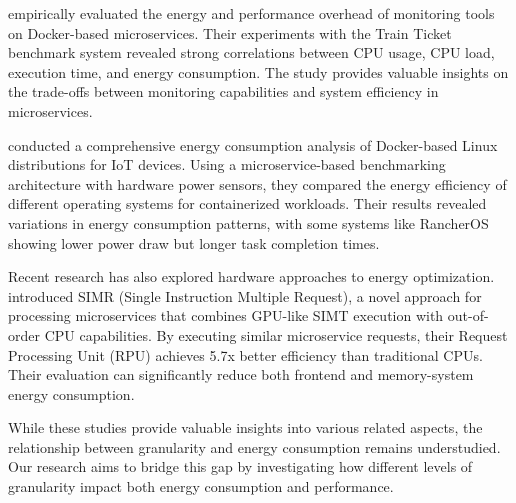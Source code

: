 \citet{dinga2023empirical} empirically evaluated the energy and performance overhead of monitoring tools on Docker-based microservices.
Their experiments with the Train Ticket benchmark system revealed strong correlations between CPU usage, CPU load, execution time, and energy consumption.
The study provides valuable insights on the trade-offs between monitoring capabilities and system efficiency in microservices.

\citet{9453517} conducted a comprehensive energy consumption analysis of Docker-based Linux distributions for IoT devices.
Using a microservice-based benchmarking architecture with hardware power sensors, they compared the energy efficiency of different operating systems for containerized workloads.
Their results revealed variations in energy consumption patterns, with some systems like RancherOS showing lower power draw but longer task completion times. 

Recent research has also explored hardware approaches to energy optimization.
\citet{9923866} introduced SIMR (Single Instruction Multiple Request), a novel approach for processing microservices that combines GPU-like SIMT execution with out-of-order CPU capabilities.
By executing similar microservice requests, their Request Processing Unit (RPU) achieves 5.7x better efficiency than traditional CPUs.
Their evaluation can significantly reduce both frontend and memory-system energy consumption.

While these studies provide valuable insights into various related aspects, the relationship between granularity and energy consumption remains understudied.
Our research aims to bridge this gap by investigating how different levels of granularity impact both energy consumption and performance.